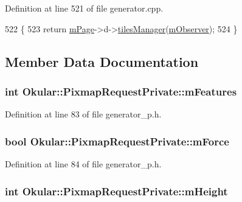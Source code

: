 Definition at line 521 of file generator.\+cpp.


\begin{DoxyCode}
522 \{
523     \textcolor{keywordflow}{return} \hyperlink{classOkular_1_1PixmapRequestPrivate_a8de6dea67745c17947f997857c77ed07}{mPage}->d->\hyperlink{classOkular_1_1PagePrivate_a8eec394b8e7492196e204812d82e89c6}{tilesManager}(\hyperlink{classOkular_1_1PixmapRequestPrivate_acfdc694944c13c00f0c7dee73f440139}{mObserver});
524 \}
\end{DoxyCode}


\subsection{Member Data Documentation}
\hypertarget{classOkular_1_1PixmapRequestPrivate_a22a10f49133b6f62fff918434ced5c76}{
\subsubsection[{m\+Features}]{\setlength{\rightskip}{0pt plus 5cm}int Okular\+::\+Pixmap\+Request\+Private\+::m\+Features}}\label{classOkular_1_1PixmapRequestPrivate_a22a10f49133b6f62fff918434ced5c76}


Definition at line 83 of file generator\+\_\+p.\+h.

\hypertarget{classOkular_1_1PixmapRequestPrivate_acf386d17b15b2fbbeac1046a87cc487f}{
\subsubsection[{m\+Force}]{\setlength{\rightskip}{0pt plus 5cm}bool Okular\+::\+Pixmap\+Request\+Private\+::m\+Force}}\label{classOkular_1_1PixmapRequestPrivate_acf386d17b15b2fbbeac1046a87cc487f}


Definition at line 84 of file generator\+\_\+p.\+h.

\hypertarget{classOkular_1_1PixmapRequestPrivate_a756c8dbe6025c29ba8e640a272daa9e7}{
\subsubsection[{m\+Height}]{\setlength{\rightskip}{0pt plus 5cm}int Okular\+::\+Pixmap\+Request\+Private\+::m\+Height}}\label{classOkular_1_1PixmapRequestPrivate_a756c8dbe6025c29ba8e640a272daa9e7}


